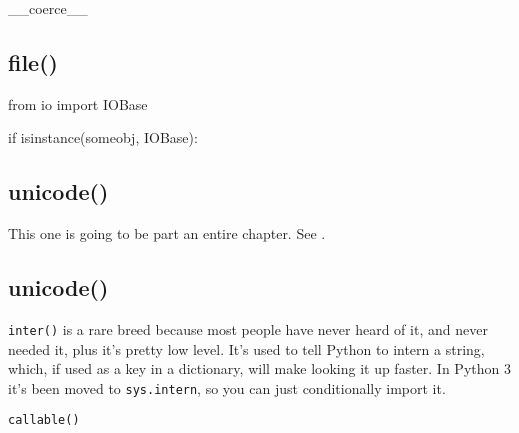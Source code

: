 \_\_coerce\_\_

\subsection{file()}

\begin{py2}
from io import IOBase

if isinstance(someobj, IOBase):
\end{py2}

\subsection{unicode()}

This one is going to be part an entire chapter. See .

\subsection{unicode()}

\lstinline{inter()} is a rare breed because most people have never heard of it, and never needed it, plus it's pretty low level. It's used to tell Python to intern a string, which, if used as a key in a dictionary, will make looking it up faster. In Python 3 it's been moved to \lstinline{sys.intern}, so you can just conditionally import it.

\lstinline{callable()}

